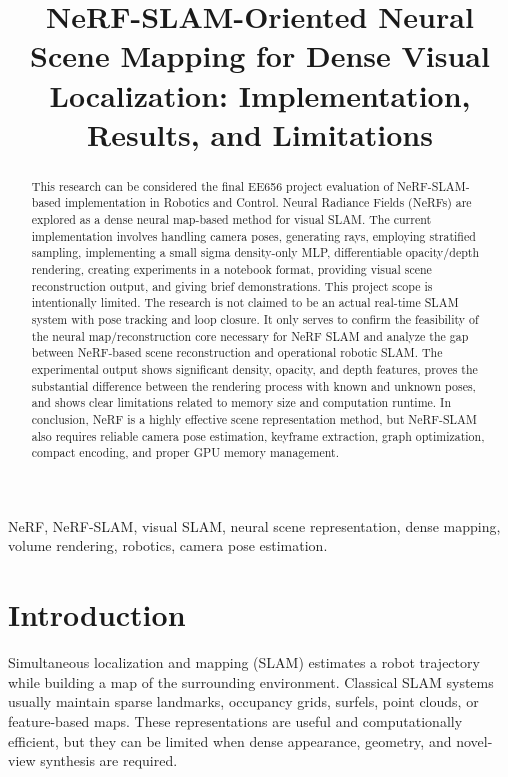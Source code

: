 \documentclass[conference]{IEEEtran}
\title{NeRF-SLAM-Oriented Neural Scene Mapping for Dense Visual Localization: Implementation, Results, and Limitations}
\author{\IEEEauthorblockN{Muhammed Elyamani}
\IEEEauthorblockA{EE656 -- Robotics \& Control\\
King Fahd University of Petroleum \& Minerals (KFUPM)\\
Student ID: G202427600\\
Instructor: Dr. Ali AlBeladi}}
\begin{document}
\maketitle

\begin{abstract}
This research can be considered the final EE656 project evaluation of NeRF-SLAM-based implementation in Robotics and Control. Neural Radiance Fields (NeRFs) are explored as a dense neural map-based method for visual SLAM. The current implementation involves handling camera poses, generating rays, employing stratified sampling, implementing a small sigma density-only MLP, differentiable opacity/depth rendering, creating experiments in a notebook format, providing visual scene reconstruction output, and giving brief demonstrations. This project scope is intentionally limited. The research is not claimed to be an actual real-time SLAM system with pose tracking and loop closure. It only serves to confirm the feasibility of the neural map/reconstruction core necessary for NeRF SLAM and analyze the gap between NeRF-based scene reconstruction and operational robotic SLAM. The experimental output shows significant density, opacity, and depth features, proves the substantial difference between the rendering process with known and unknown poses, and shows clear limitations related to memory size and computation runtime. In conclusion, NeRF is a highly effective scene representation method, but NeRF-SLAM also requires reliable camera pose estimation, keyframe extraction, graph optimization, compact encoding, and proper GPU memory management.
\end{abstract}

\begin{IEEEkeywords}
NeRF, NeRF-SLAM, visual SLAM, neural scene representation, dense mapping, volume rendering, robotics, camera pose estimation.
\end{IEEEkeywords}

\section{Introduction}
Simultaneous localization and mapping (SLAM) estimates a robot trajectory while building a map of the surrounding environment. Classical SLAM systems usually maintain sparse landmarks, occupancy grids, surfels, point clouds, or feature-based maps. These representations are useful and computationally efficient, but they can be limited when dense appearance, geometry, and novel-view synthesis are required.
\end{document}
